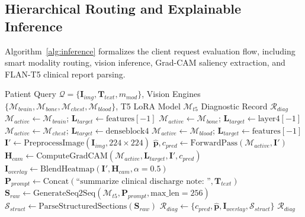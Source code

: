 \documentclass[conference]{IEEEtran}
\begin{document}
\subsection{Hierarchical Routing and Explainable Inference}
Algorithm~\ref{alg:inference} formalizes the client request evaluation flow, including smart modality routing, vision inference, Grad-CAM saliency extraction, and FLAN-T5 clinical report parsing.

\begin{algorithm}[htbp]
\caption{Smart Modality Routing, Grad-CAM Explainability, and T5 Report Generation}
\label{alg:inference}
\begin{algorithmic}[1]
\REQUIRE Patient Query $\mathcal{Q} = \{\mathbf{I}_{img}, \mathbf{T}_{text}, m_{mod}\}$, Vision Engines $\{\mathcal{M}_{brain}, \mathcal{M}_{bone}, \mathcal{M}_{chest}, \mathcal{M}_{blood}\}$, T5 LoRA Model $\mathcal{M}_{t5}$
\ENSURE Diagnostic Record $\mathcal{R}_{diag}$
    \STATE $\mathcal{M}_{active} \leftarrow \mathcal{M}_{brain}$; $\mathbf{L}_{target} \leftarrow \text{features}[-1]$
    \STATE $\mathcal{M}_{active} \leftarrow \mathcal{M}_{bone}$; $\mathbf{L}_{target} \leftarrow \text{layer4}[-1]$
    \STATE $\mathcal{M}_{active} \leftarrow \mathcal{M}_{chest}$; $\mathbf{L}_{target} \leftarrow \text{denseblock4}$
    \STATE $\mathcal{M}_{active} \leftarrow \mathcal{M}_{blood}$; $\mathbf{L}_{target} \leftarrow \text{features}[-1]$
\ENDIF
\STATE $\mathbf{I}' \leftarrow \text{PreprocessImage}(\mathbf{I}_{img}, 224 \times 224)$
\STATE $\hat{\mathbf{p}}, c_{pred} \leftarrow \text{ForwardPass}(\mathcal{M}_{active}, \mathbf{I}')$
\STATE $\mathbf{H}_{cam} \leftarrow \text{ComputeGradCAM}(\mathcal{M}_{active}, \mathbf{L}_{target}, \mathbf{I}', c_{pred})$ 
\STATE $\mathbf{I}_{overlay} \leftarrow \text{BlendHeatmap}(\mathbf{I}', \mathbf{H}_{cam}, \alpha=0.5)$
\STATE $\mathbf{P}_{prompt} \leftarrow \text{Concat}(\text{``summarize clinical discharge note: ''}, \mathbf{T}_{text})$
\STATE $\mathbf{S}_{raw} \leftarrow \text{GenerateSeq2Seq}(\mathcal{M}_{t5}, \mathbf{P}_{prompt}, \text{max\_len}=256)$
\STATE $\mathcal{S}_{struct} \leftarrow \text{ParseStructuredSections}(\mathbf{S}_{raw})$
\STATE $\mathcal{R}_{diag} \leftarrow \{c_{pred}, \hat{\mathbf{p}}, \mathbf{I}_{overlay}, \mathcal{S}_{struct}\}$
\RETURN $\mathcal{R}_{diag}$
\end{algorithmic}
\end{algorithm}
\end{document}
